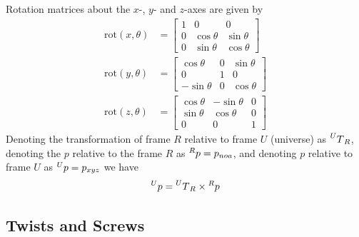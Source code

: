 \documentclass[11pt]{book}
\theoremstyle{example}
\begin{document}
Rotation matrices about the $x$-, $y$- and $z$-axes are given by
\begin{equation}
	\begin{aligned}
		\mathrm{rot}(x,\theta)&=
		\begin{bmatrix}
			1&0&0\\
			0&\cos{\theta}&\sin{\theta}\\
			0&\sin{\theta}&\cos{\theta}
		\end{bmatrix}\\
		\mathrm{rot}(y,\theta)&=
		\begin{bmatrix}
			\cos{\theta}&0&\sin{\theta}\\
			0&1&0\\
			-\sin{\theta}&0&\cos{\theta}
		\end{bmatrix}\\
		\mathrm{rot}(z,\theta)&=
		\begin{bmatrix}
			\cos{\theta}&-\sin{\theta}&0\\
			\sin{\theta}&\cos{\theta}&0\\
			0&0&1
		\end{bmatrix}
	\end{aligned}
\end{equation}
Denoting the transformation of frame $R$ relative to frame $U$ (universe) as $\prescript{U}{}T_R$, denoting the $p$ relative to the frame $R$ as $\prescript{R}{}p=p_{noa}$, and denoting $p$ relative to frame $U$ as $\prescript{U}{}p=p_{xyz}$ we have
\begin{equation}
	\prescript{U}{}p=\prescript{U}{}T_R\times\prescript{R}{}p
\end{equation}

\subsection{Twists and Screws}
\end{document}
